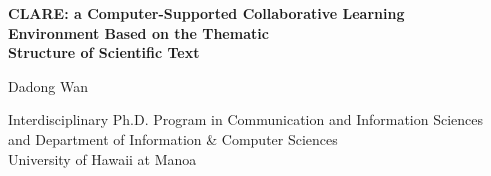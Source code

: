 


\thispagestyle{empty}

\begin{center}
  {\large\bf CLARE: a Computer-Supported Collaborative Learning\\
  Environment Based on the Thematic\\
  Structure of Scientific Text}\\  \bigskip
  
  Dadong Wan\\ \medskip
  
  Interdisciplinary Ph.D. Program in Communication and Information Sciences\\
  and Department of Information \& Computer Sciences\\
  University of Hawaii at Manoa
\end{center}

